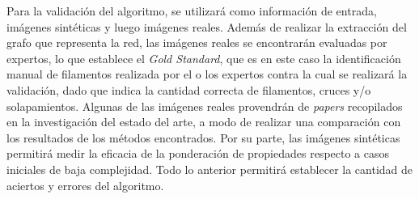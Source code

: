 \documentclass{article}
\begin{document}
Para la validaci\'on del algoritmo, se utilizar\'a como informaci\'on de entrada, im\'agenes sint\'eticas y luego im\'agenes reales. Adem\'as de realizar la extracci\'on del grafo que representa la red, las im\'agenes reales se encontrar\'an evaluadas por expertos, lo que establece el \textit{Gold Standard}, que es en este caso la identificaci\'on manual de filamentos realizada por el o los expertos contra la cual se realizar\'a la validaci\'on, dado que indica la cantidad correcta de filamentos, cruces y/o solapamientos.
Algunas de las im\'agenes reales provendr\'an de {\it papers} recopilados en la investigaci\'on del estado del arte, a modo de realizar una comparaci\'on con los resultados de los m\'etodos encontrados. Por su parte, las im\'agenes sint\'eticas permitir\'a medir la eficacia de la ponderaci\'on de propiedades respecto a casos iniciales de baja complejidad. Todo lo anterior permitir\'a establecer la cantidad de aciertos y errores del algoritmo.




\end{document}
